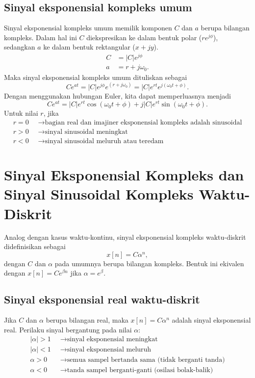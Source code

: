 \subsection{Sinyal eksponensial kompleks umum}
Sinyal eksponensial kompleks umum memilik komponen $C$ dan $a$ berupa bilangan kompleks. Dalam hal ini $C$ diekspresikan ke dalam bentuk polar ($re^{j \phi}$), sedangkan $a$ ke dalam bentuk rektangular ($x+jy$). 
\begin{align*}
C&=|C|e^{j\phi}\\
a&=r+j\omega_0.
\end{align*}
Maka sinyal eksponensial kompleks umum dituliskan sebagai
\begin{equation}
Ce^{at}=|C|e^{j\phi}e^{(r+j\omega_0)}=|C|e^{rt}e^{j(\omega_0 t+\phi)}.
\end{equation}
Dengan menggunakan hubungan Euler, kita dapat memperluasnya menjadi
\begin{equation}
Ce^{at}=|C|e^{rt} \cos(\omega_0 t+\phi)+j|C|e^{rt}\sin(\omega_0 t+\phi).
\end{equation}
Untuk nilai $r$, jika
\begin{align*}
r=0\;\;&\rightarrow \text{bagian real dan imajiner eksponensial kompleks adalah sinusoidal}\\
r>0\;\;&\rightarrow \text{sinyal sinusoidal meningkat}\\
r<0\;\;&\rightarrow \text{sinyal sinusoidal meluruh atau teredam}
\end{align*}

\section{Sinyal Eksponensial Kompleks dan Sinyal Sinusoidal Kompleks Waktu-Diskrit}

Analog dengan kasus waktu-kontinu, sinyal eksponensial kompleks waktu-diskrit didefinisikan sebagai
\begin{equation}
x[n] = C\alpha^n,
\end{equation}
dengan $C$ dan $\alpha$ pada umumnya berupa bilangan kompleks. Bentuk ini ekivalen dengan $x[n] = Ce^{\beta n}$ jika $\alpha = e^\beta$.

\subsection{Sinyal eksponensial real waktu-diskrit}

Jika $C$ dan $\alpha$ berupa bilangan real, maka $x[n] = C\alpha^n$ adalah sinyal eksponensial real. Perilaku sinyal bergantung pada nilai $\alpha$:
\begin{align*}
|\alpha| > 1 \;\;&\rightarrow \text{sinyal eksponensial meningkat}\\
|\alpha| < 1 \;\;&\rightarrow \text{sinyal eksponensial meluruh}\\
\alpha > 0    \;\;&\rightarrow \text{semua sampel bertanda sama (tidak berganti tanda)}\\
\alpha < 0    \;\;&\rightarrow \text{tanda sampel berganti-ganti (osilasi bolak-balik)}
\end{align*}

